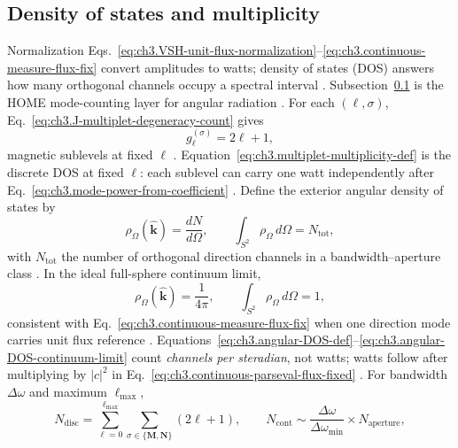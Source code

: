 \subsection{Density of states and multiplicity}
\label{sec:ch353}
Normalization Eqs.~\eqref{eq:ch3.VSH-unit-flux-normalization}--\eqref{eq:ch3.continuous-measure-flux-fix} convert
amplitudes to watts; density of states (DOS) answers how many orthogonal channels occupy a spectral interval
\cite{jackson1999}. Subsection~\ref{sec:ch353} is the HOME mode-counting layer for
angular radiation \cite{hansen1988}.
For each \((\ell,\sigma)\), Eq.~\eqref{eq:ch3.J-multiplet-degeneracy-count} gives
\begin{equation}
\label{eq:ch3.multiplet-multiplicity-def}
g_{\ell}^{(\sigma)}=2\ell+1,
\end{equation}
magnetic sublevels at fixed \(\ell\) \cite{jackson1999}. Equation~\eqref{eq:ch3.multiplet-multiplicity-def}
is the discrete DOS at fixed \(\ell\): each sublevel can carry one watt independently after
Eq.~\eqref{eq:ch3.mode-power-from-coefficient} \cite{harrington2001}.
Define the exterior angular density of states by
\begin{equation}
\label{eq:ch3.angular-DOS-def}
\rho_{\Omega}(\hat{\mathbf{k}})
=
\frac{dN}{d\Omega},
\qquad
\int_{S^{2}}\rho_{\Omega}\,d\Omega
=
N_{\mathrm{tot}},
\end{equation}
with \(N_{\mathrm{tot}}\) the number of orthogonal direction channels in a bandwidth--aperture class
\cite{jackson1999}. In the ideal full-sphere continuum limit,
\begin{equation}
\label{eq:ch3.angular-DOS-continuum-limit}
\rho_{\Omega}(\hat{\mathbf{k}})=\frac{1}{4\pi},
\qquad
\int_{S^{2}}\rho_{\Omega}\,d\Omega=1,
\end{equation}
consistent with Eq.~\eqref{eq:ch3.continuous-measure-flux-fix} when one direction mode carries unit flux reference
\cite{hansen1988}. Equations~\eqref{eq:ch3.angular-DOS-def}--\eqref{eq:ch3.angular-DOS-continuum-limit}
count \emph{channels per steradian}, not watts; watts follow after multiplying by \(|c|^{2}\) in
Eq.~\eqref{eq:ch3.continuous-parseval-flux-fixed} \cite{poynting1884}.
For bandwidth \(\Delta\omega\) and maximum \(\ell_{\max}\),
\begin{equation}
\label{eq:ch3.hybrid-DOS-count}
N_{\mathrm{disc}}
=
\sum_{\ell=0}^{\ell_{\max}}\sum_{\sigma\in\{\mathbf{M},\mathbf{N}\}}(2\ell+1),
\qquad
N_{\mathrm{cont}}
\sim
\frac{\Delta\omega}{\Delta\omega_{\min}}\times N_{\mathrm{aperture}},
\end{equation}
